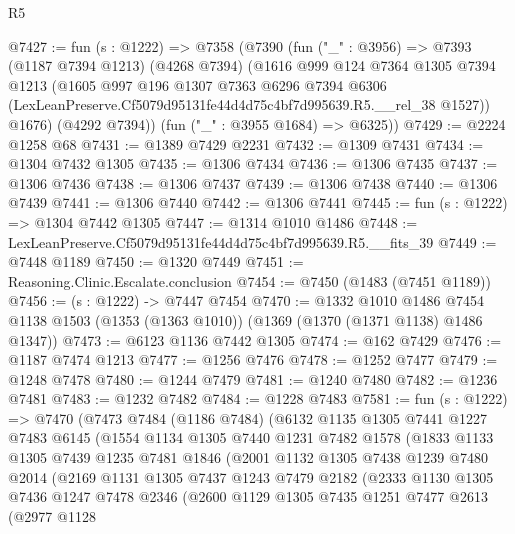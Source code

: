 \begin{lexlean}{R5}
\begin{coremodule}
@7427 := fun (s : @1222) =>
  @7358
    (@7390
      (fun ("_" : @3956) =>
      @7393
        (@1187 @7394 @1213)
        (@4268 @7394)
        (@1616
          @999
          @124
          @7364
          @1305
          @7394
          @1213
          (@1605
            @997
            @196
            @1307
            @7363
            @6296
            @7394
            @6306
            (LexLeanPreserve.Cf5079d95131fe44d4d75c4bf7d995639.R5.__rel_38 @1527))
          @1676)
        (@4292 @7394))
      (fun ("_" : @3955 @1684) => @6325))
@7429 := @2224 @1258 @68
@7431 := @1389 @7429 @2231
@7432 := @1309 @7431
@7434 := @1304 @7432 @1305
@7435 := @1306 @7434
@7436 := @1306 @7435
@7437 := @1306 @7436
@7438 := @1306 @7437
@7439 := @1306 @7438
@7440 := @1306 @7439
@7441 := @1306 @7440
@7442 := @1306 @7441
@7445 := fun (s : @1222) => @1304 @7442 @1305
@7447 := @1314 @1010 @1486
@7448 := LexLeanPreserve.Cf5079d95131fe44d4d75c4bf7d995639.R5.__fits_39
@7449 := @7448 @1189
@7450 := @1320 @7449
@7451 := Reasoning.Clinic.Escalate.conclusion
@7454 := @7450 (@1483 (@7451 @1189))
@7456 := (s : @1222) -> @7447 @7454
@7470 := @1332
    @1010
    @1486
    @7454
    @1138
    @1503
    (@1353 (@1363 @1010))
    (@1369 (@1370 (@1371 @1138) @1486 @1347))
@7473 := @6123 @1136 @7442 @1305
@7474 := @162 @7429
@7476 := @1187 @7474 @1213
@7477 := @1256 @7476
@7478 := @1252 @7477
@7479 := @1248 @7478
@7480 := @1244 @7479
@7481 := @1240 @7480
@7482 := @1236 @7481
@7483 := @1232 @7482
@7484 := @1228 @7483
@7581 := fun (s : @1222) =>
  @7470
    (@7473
      @7484
      (@1186 @7484)
      (@6132
        @1135
        @1305
        @7441
        @1227
        @7483
        @6145
        (@1554
          @1134
          @1305
          @7440
          @1231
          @7482
          @1578
          (@1833
            @1133
            @1305
            @7439
            @1235
            @7481
            @1846
            (@2001
              @1132
              @1305
              @7438
              @1239
              @7480
              @2014
              (@2169
                @1131
                @1305
                @7437
                @1243
                @7479
                @2182
                (@2333
                  @1130
                  @1305
                  @7436
                  @1247
                  @7478
                  @2346
                  (@2600
                    @1129
                    @1305
                    @7435
                    @1251
                    @7477
                    @2613
                    (@2977
                      @1128

\end{coremodule}
\end{lexlean}
